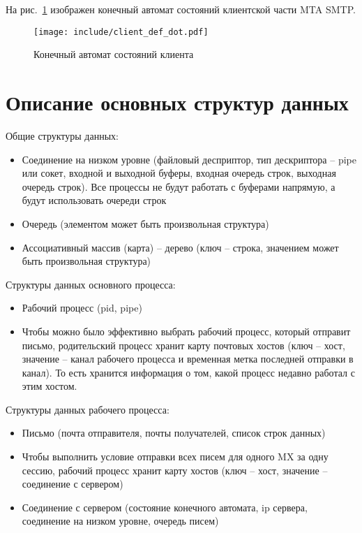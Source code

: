\documentclass[a4paper,12pt]{report}
\begin{document}
На рис.~\ref{fig:fsm} изображен конечный автомат состояний клиентской части MTA SMTP. 

\begin{figure}[h]
    \centering
    \texttt{[image: include/client\_def\_dot.pdf]}
    \caption{Конечный автомат состояний клиента}
    \label{fig:fsm}
\end{figure}

\section{Описание основных структур данных}

Общие структуры данных:
\begin{itemize}
    \item Соединение на низком уровне (файловый десприптор, тип дескриптора -- pipe или сокет, входной и выходной буферы, входная очередь строк, выходная очередь строк). Все процессы не будут работать с буферами напрямую, а будут использовать очереди строк
    \item Очередь (элементом может быть произвольная структура)
    \item Ассоциативный массив (карта) -- дерево (ключ -- строка, значением может быть произвольная структура)
\end{itemize}

Структуры данных основного процесса:
\begin{itemize}
    \item Рабочий процесс (pid, pipe)
    \item Чтобы можно было эффективно выбрать рабочий процесс, который отправит письмо, родительский процесс хранит карту почтовых хостов (ключ -- хост, значение -- канал рабочего процесса и временная метка последней отправки в канал). То есть хранится информация о том, какой процесс недавно работал с этим хостом.
\end{itemize}

Структуры данных рабочего процесса:
\begin{itemize}
    \item Письмо (почта отправителя, почты получателей, список строк данных)
    \item Чтобы выполнить условие отправки всех писем для одного MX за одну сессию, рабочий процесс хранит карту хостов (ключ -- хост, значение -- соединение с сервером)
    \item Соединение с сервером (состояние конечного автомата, ip сервера, соединение на низком уровне, очередь писем)
\end{itemize}
\end{document}
